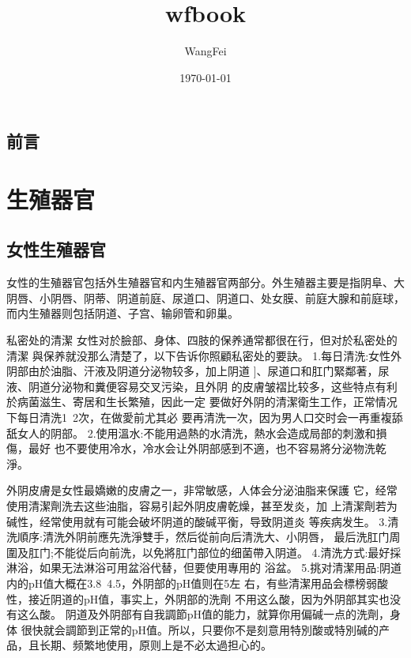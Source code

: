 \documentclass[12pt,UTF8]{ctexbook}
\title{\heiti\zihao{0} wfbook}
\author{WangFei}
\date{\today}
\begin{document}
\maketitle
\tableofcontents

\frontmatter

\chapter{前言}



\mainmatter

\part{生殖器官}

\chapter{女性生殖器官}

女性的生殖器官包括外生殖器官和内生殖器官两部分。外生殖器主要是指阴阜、大阴唇、小阴唇、阴蒂、阴道前庭、尿道口、阴道口、处女膜、前庭大腺和前庭球，而内生殖器则包括阴道、子宫、输卵管和卵巢。

私密处的清潔
女性对於臉部、身体、四肢的保养通常都很在行，但对於私密处的清潔
與保养就没那么清楚了，以下告诉你照顧私密处的要訣。
1.每日清洗:女性外阴部由於油脂、汗液及阴道分泌物较多，加上阴道
]、尿道口和肛门緊鄰著，尿液、阴道分泌物和糞便容易交叉污染，且外阴
的皮膚皱褶比较多，这些特点有利於病菌滋生、寄居和生长繁殖，因此一定
要做好外阴的清潔衛生工作，正常情况下每日清洗1~2次，在做愛前尤其必
要再清洗一次，因为男人口交时会一再重複舔舐女人的阴部。
2.使用溫水:不能用過熱的水清洗，熱水会造成局部的刺激和損傷，最好
也不要使用冷水，冷水会让外阴部感到不適，也不容易將分泌物洗乾淨。

外阴皮膚是女性最嬌嫩的皮膚之一，非常敏感，人体会分泌油脂来保護
它，经常使用清潔劑洗去这些油脂，容易引起外阴皮膚乾燥，甚至发炎，加
上清潔劑若为碱性，经常使用就有可能会破坏阴道的酸碱平衡，导致阴道炎
等疾病发生。
3.清洗順序:清洗外阴前應先洗淨雙手，然后從前向后清洗大、小阴唇，
最后洗肛门周圍及肛门;不能從后向前洗，以免將肛门部位的细菌帶入阴道。
4.清洗方式:最好採淋浴，如果无法淋浴可用盆浴代替，但要使用專用的
浴盆。
5.挑对清潔用品:阴道内的pH值大概在3.8~4.5，外阴部的pH值则在5左
右，有些清潔用品会標榜弱酸性，接近阴道的pH值，事实上，外阴部的洗劑
不用这么酸，因为外阴部其实也没有这么酸。
阴道及外阴部有自我調節pH值的能力，就算你用偏碱一点的洗劑，身体
很快就会調節到正常的pH值。所以，只要你不是刻意用特別酸或特別碱的产
品，且长期、频繁地使用，原则上是不必太過担心的。
\end{document}
